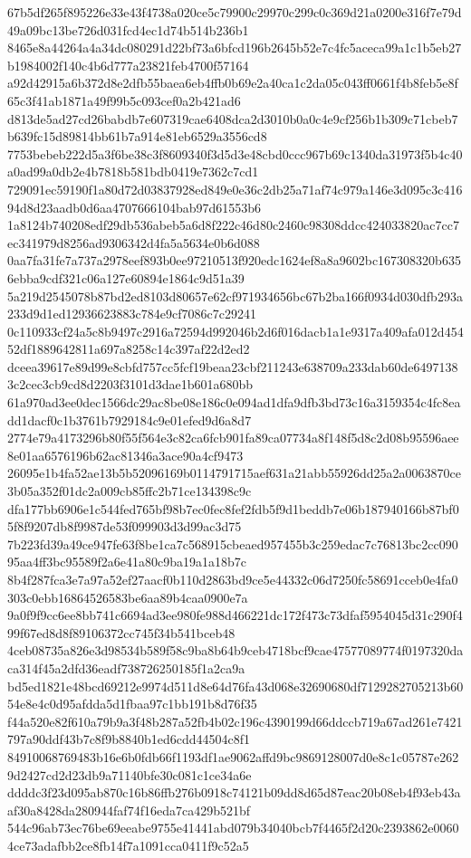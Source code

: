 \documentclass[11pt,a4paper]{article}
\begin{document}
{67b5df265f895226e33e43f4738a020ce5c79900c29970c299c0c369d21a0200e316f7e79d49a09bc13be726d031fcd4ec1d74b514b236b1
8465e8a44264a4a34dc080291d22bf73a6bfcd196b2645b52e7c4fc5aceca99a1c1b5eb27b1984002f140c4b6d777a23821feb4700f57164
a92d42915a6b372d8e2dfb55baea6eb4ffb0b69e2a40ca1c2da05c043ff0661f4b8feb5e8f65c3f41ab1871a49f99b5c093cef0a2b421ad6
d813de5ad27cd26babdb7e607319cae6408dca2d3010b0a0c4e9cf256b1b309c71cbeb7b639fc15d89814bb61b7a914e81eb6529a3556cd8
7753bebeb222d5a3f6be38c3f8609340f3d5d3e48cbd0ccc967b69c1340da31973f5b4c40a0ad99a0db2e4b7818b581bdb0419e7362c7cd1
729091ec59190f1a80d72d03837928ed849e0e36c2db25a71af74c979a146e3d095c3c41694d8d23aadb0d6aa4707666104bab97d61553b6
1a8124b740208edf29db536abeb5a6d8f222c46d80c2460c98308ddcc424033820ac7cc7ec341979d8256ad9306342d4fa5a5634e0b6d088
0aa7fa31fe7a737a2978eef893b0ee97210513f920edc1624ef8a8a9602bc167308320b6356ebba9cdf321c06a127e60894e1864c9d51a39
5a219d2545078b87bd2ed8103d80657e62cf971934656bc67b2ba166f0934d030dfb293a233d9d1ed12936623883c784e9cf7086c7c29241
0c110933cf24a5c8b9497c2916a72594d992046b2d6f016dacb1a1e9317a409afa012d45452df1889642811a697a8258c14c397af22d2ed2
dceea39617e89d99e8cbfd757cc5fcf19beaa23cbf211243e638709a233dab60de64971383c2cec3cb9cd8d2203f3101d3dae1b601a680bb
61a970ad3ee0dec1566dc29ac8be08e186c0e094ad1dfa9dfb3bd73c16a3159354c4fc8eadd1dacf0c1b3761b7929184c9e01efed9d6a8d7
2774e79a4173296b80f55f564e3c82ca6fcb901fa89ca07734a8f148f5d8c2d08b95596aee8e01aa6576196b62ac81346a3ace90a4cf9473
26095e1b4fa52ae13b5b52096169b0114791715aef631a21abb55926dd25a2a0063870ce3b05a352f01dc2a009cb85ffc2b71ce134398c9c
dfa177bb6906e1c544fed765bf98b7ec0fec8fef2fdb5f9d1beddb7e06b187940166b87bf05f8f9207db8f9987de53f099903d3d99ac3d75
7b223fd39a49ce947fe63f8be1ca7c568915cbeaed957455b3c259edac7c76813bc2cc09095aa4ff3bc95589f2a6e41a80c9ba19a1a18b7c
8b4f287fca3e7a97a52ef27aacf0b110d2863bd9ce5e44332c06d7250fc58691cceb0e4fa0303c0ebb16864526583be6aa89b4caa0900e7a
9a0f9f9cc6ee8bb741c6694ad3ee980fe988d466221dc172f473c73dfaf5954045d31c290f499f67ed8d8f89106372cc745f34b541bceb48
4ceb08735a826e3d98534b589f58c9ba8b64b9ceb4718bcf9cae47577089774f0197320daca314f45a2dfd36eadf738726250185f1a2ca9a
bd5ed1821e48bcd69212e9974d511d8e64d76fa43d068e32690680df7129282705213b6054e8e4c0d95afdda5d1fbaa97c1bb191b8d76f35
f44a520e82f610a79b9a3f48b287a52fb4b02c196c4390199d66ddccb719a67ad261e7421797a90ddf43b7c8f9b8840b1ed6cdd44504c8f1
84910068769483b16e6b0fdb66f1193df1ae9062affd9bc9869128007d0e8c1c05787e2629d2427cd2d23db9a71140bfe30c081c1ce34a6e
ddddc3f23d095ab870c16b86ffb276b0918c74121b09dd8d65d87eac20b08eb4f93eb43aaf30a8428da280944faf74f16eda7ca429b521bf
544c96ab73ec76be69eeabe9755e41441abd079b34040bcb7f4465f2d20c2393862e00604ce73adafbb2ce8fb14f7a1091cca0411f9c52a5
}
\end{document}
